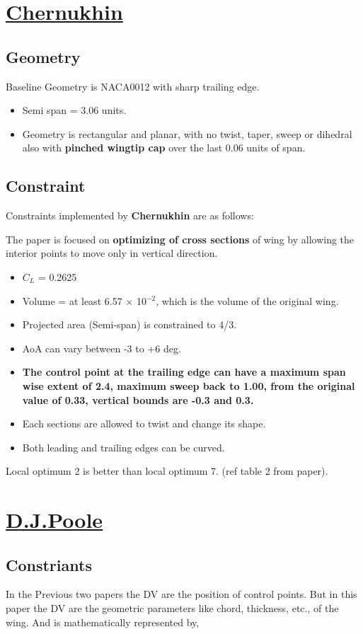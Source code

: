 \section{\underline{Chernukhin}}
\subsection{Geometry}
Baseline Geometry is NACA0012 with sharp trailing edge.
\begin{itemize}
\item Semi span = 3.06 units.
\item Geometry is rectangular and planar, with no twist, taper, sweep or dihedral also with \textbf{pinched wingtip cap} over the last 0.06 units of span.\cite{oleg} 
\end{itemize}
\subsection{Constraint}
Constraints implemented by \textbf{Chernukhin} are as follows:

The paper is focused on \textbf{optimizing of cross sections} of wing by allowing the interior points to move only in vertical direction. 
\begin{itemize}
\item $C_L$ = 0.2625
\item Volume = at least 6.57 $\times$ 10$^{-2}$, which is the volume of the original wing.
\item Projected area (Semi-span) is constrained to 4/3.
\item AoA can vary between -3 to +6 deg.
\item \textbf{The control point at the trailing edge can have a maximum span wise extent of 2.4, maximum sweep back to 1.00, from the original value of 0.33, vertical bounds  are -0.3 and 0.3.}
\item Each sections are allowed to twist and change its shape.
\item Both leading and trailing edges can be curved.
\end{itemize}

Local optimum 2 is better than local optimum 7. (ref table 2 from paper). 

\section{\underline{D.J.Poole}}
\subsection{Constriants}
In the Previous two papers the DV are the position of control points. But in this paper the DV are the geometric parameters like chord, thickness, etc., of the wing. And is mathematically represented by,

